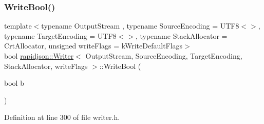 \subsubsection{\texorpdfstring{WriteBool()}{WriteBool()}}
{\footnotesize\ttfamily template$<$typename Output\+Stream , typename Source\+Encoding  = U\+T\+F8$<$$>$, typename Target\+Encoding  = U\+T\+F8$<$$>$, typename Stack\+Allocator  = Crt\+Allocator, unsigned write\+Flags = k\+Write\+Default\+Flags$>$ \\
bool \mbox{\hyperlink{classrapidjson_1_1_writer}{rapidjson\+::\+Writer}}$<$ Output\+Stream, Source\+Encoding, Target\+Encoding, Stack\+Allocator, write\+Flags $>$\+::Write\+Bool (\begin{DoxyParamCaption}\item[{bool}]{b }\end{DoxyParamCaption})\hspace{0.3cm}{\ttfamily [protected]}}



Definition at line 300 of file writer.\+h.


